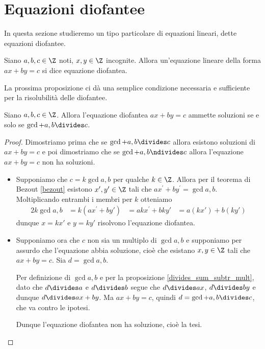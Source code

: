 \section{Equazioni diofantee}

In questa sezione studieremo un tipo particolare di equazioni lineari, dette equazioni diofantee.

\begin{definition}
    Siano $a, b, c \in \Z$ noti, $x, y \in \Z$ incognite. Allora un'equazione lineare della forma $ax + by = c$ si dice equazione diofantea.
\end{definition}

La prossima proposizione ci dà una semplice condizione necessaria e sufficiente per la risolubilità delle diofantee.

\begin{theorem}
    \label{th:cond_ris_diofantea}
    Siano $a, b, c \in \Z$. Allora l'equazione diofantea $ax + by = c$ ammette soluzioni se e solo se $\gcd{a, b} \divides c$.
\end{theorem}
\begin{proof}
    Dimostriamo prima che se $\gcd{a, b} \divides c$ allora esistono soluzioni di $ax + by = c$ e poi dimostriamo che se $\gcd{a, b} \ndivides c$ allora l'equazione $ax + by = c$ non ha soluzioni.
    \begin{itemize}
        \item Supponiamo che $c = k\gcd{a, b}$ per qualche $k \in \Z$. Allora per il teorema di Bezout \ref{bezout} esistono $x', y^\prime \in \Z$ tali che $ax^\prime + by^\prime = \gcd{a, b}$. Moltiplicando  entrambi i membri per $k$ otteniamo
        \begin{alignat*}{2} 
            k\gcd{a, b} &= k(ax^\prime + by')
                        &= akx^\prime + bky'
                        &= a(kx') + b(ky')
        \end{alignat*}
        dunque $x = kx'$ e $y = ky'$ risolvono l'equazione diofantea.
        \item Supponiamo ora che $c$ non sia un multiplo di $\gcd{a, b}$ e supponiamo per assurdo che l'equazione abbia soluzione, cioè che esistano $x, y \in \Z$ tali che $ax + by = c$. Sia $d = \gcd{a, b}$.
        
        Per definizione di $\gcd{a, b}$ e per la proposizione \ref{divides_sum_subtr_mult}, dato che $d \divides a$ e $d \divides b$ segue che $d \divides ax$, $d \divides by$ e dunque $d \divides ax + by$. Ma $ax + by = c$, quindi $d = \gcd{a, b} \divides c$, che va contro le ipotesi.

        Dunque l'equazione diofantea non ha soluzione, cioè la tesi. \qedhere
    \end{itemize}
\end{proof}

